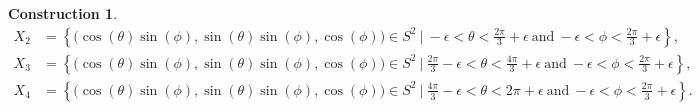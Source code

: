 \documentclass{article}
\theoremstyle{plain}
\theoremstyle{definition}
\newtheorem{const}[thm]{Construction}
\begin{document}
\begin{appendices}
\begin{const}
\begin{align*}
X_2 & = \left\{\bigl(\cos(\theta)\sin(\phi),\sin(\theta)\sin(\phi),\cos(\phi)\bigr) \in S^2 ~ \big\vert ~ -\epsilon < \theta < \frac{2\pi}{3} + \epsilon ~ \text{and} ~ -\epsilon < \phi < \frac{2\pi}{3} + \epsilon \right\}, \\
X_3 & = \left\{\bigl(\cos(\theta)\sin(\phi),\sin(\theta)\sin(\phi),\cos(\phi)\bigr) \in S^2 ~ \big\vert ~ \frac{2\pi}{3} - \epsilon < \theta < \frac{4\pi}{3} + \epsilon ~ \text{and} ~ -\epsilon < \phi < \frac{2\pi}{3} + \epsilon\right\}, \\
X_4 & = \left\{\bigl(\cos(\theta)\sin(\phi),\sin(\theta)\sin(\phi),\cos(\phi)\bigr) \in S^2 ~ \big\vert ~ \frac{4\pi}{3} - \epsilon < \theta < 2\pi + \epsilon ~ \text{and} ~ -\epsilon < \phi < \frac{2\pi}{3} + \epsilon\right\}.
\end{align*}
\end{const}


\end{appendices}

\newpage


\end{document}
